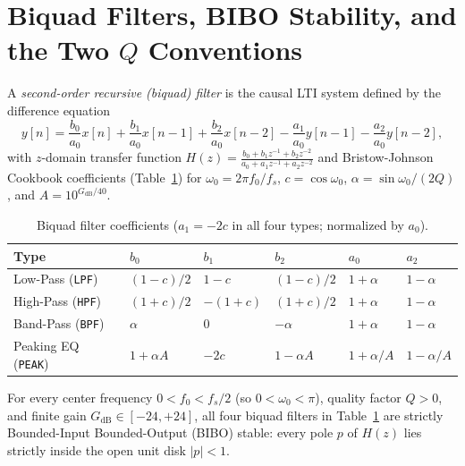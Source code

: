 \section{Biquad Filters, BIBO Stability, and the Two $Q$ Conventions}

\begin{definition}
A \emph{second-order recursive (biquad) filter} is the causal LTI system defined by the difference equation
\begin{equation}
\label{eq:biquad}
y[n] = \frac{b_0}{a_0}x[n] + \frac{b_1}{a_0}x[n-1] + \frac{b_2}{a_0}x[n-2] - \frac{a_1}{a_0}y[n-1] - \frac{a_2}{a_0}y[n-2],
\end{equation}
with $z$-domain transfer function $H(z) = \frac{b_0 + b_1 z^{-1} + b_2 z^{-2}}{a_0 + a_1 z^{-1} + a_2 z^{-2}}$ and Bristow-Johnson Cookbook coefficients (Table~\ref{tab:biquad}) for $\omega_0 = 2\pi f_0 / f_s$, $c = \cos\omega_0$, $\alpha = \sin\omega_0 / (2Q)$, and $A = 10^{G_{\mathrm{dB}}/40}$.
\end{definition}

\begin{table}[htbp]
\centering
\caption{Biquad filter coefficients ($a_1 = -2c$ in all four types; normalized by $a_0$).}
\label{tab:biquad}
\begin{tabular}{@{}llllll@{}}
\toprule
Type & $b_0$ & $b_1$ & $b_2$ & $a_0$ & $a_2$ \\
\midrule
Low-Pass (\texttt{LPF}) & $(1-c)/2$ & $1-c$ & $(1-c)/2$ & $1+\alpha$ & $1-\alpha$ \\
High-Pass (\texttt{HPF}) & $(1+c)/2$ & $-(1+c)$ & $(1+c)/2$ & $1+\alpha$ & $1-\alpha$ \\
Band-Pass (\texttt{BPF}) & $\alpha$ & $0$ & $-\alpha$ & $1+\alpha$ & $1-\alpha$ \\
Peaking EQ (\texttt{PEAK}) & $1+\alpha A$ & $-2c$ & $1-\alpha A$ & $1+\alpha/A$ & $1-\alpha/A$ \\
\bottomrule
\end{tabular}
\end{table}

\begin{theorem}
\label{thm:biquad-stable}
For every center frequency $0 < f_0 < f_s / 2$ (so $0 < \omega_0 < \pi$), quality factor $Q > 0$, and finite gain $G_{\mathrm{dB}} \in [-24, +24]$, all four biquad filters in Table~\ref{tab:biquad} are strictly Bounded-Input Bounded-Output (BIBO) stable: every pole $p$ of $H(z)$ lies strictly inside the open unit disk $|p| < 1$.
\end{theorem}

